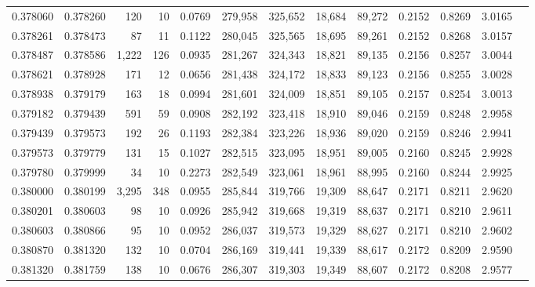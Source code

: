 \begin{tabular}{rrrrrrrrrrrrr}
0.378060 & 0.378260 &   120 &  10 &                                     0.0769 & 279,958 & 325,652 &  18,684 &  89,272 & 0.2152 & 0.8269 & 3.0165 \\
0.378261 & 0.378473 &    87 &  11 &                                     0.1122 & 280,045 & 325,565 &  18,695 &  89,261 & 0.2152 & 0.8268 & 3.0157 \\
0.378487 & 0.378586 & 1,222 & 126 &                                     0.0935 & 281,267 & 324,343 &  18,821 &  89,135 & 0.2156 & 0.8257 & 3.0044 \\
0.378621 & 0.378928 &   171 &  12 &                                     0.0656 & 281,438 & 324,172 &  18,833 &  89,123 & 0.2156 & 0.8255 & 3.0028 \\
0.378938 & 0.379179 &   163 &  18 &                                     0.0994 & 281,601 & 324,009 &  18,851 &  89,105 & 0.2157 & 0.8254 & 3.0013 \\
0.379182 & 0.379439 &   591 &  59 &                                     0.0908 & 282,192 & 323,418 &  18,910 &  89,046 & 0.2159 & 0.8248 & 2.9958 \\
0.379439 & 0.379573 &   192 &  26 &                                     0.1193 & 282,384 & 323,226 &  18,936 &  89,020 & 0.2159 & 0.8246 & 2.9941 \\
0.379573 & 0.379779 &   131 &  15 &                                     0.1027 & 282,515 & 323,095 &  18,951 &  89,005 & 0.2160 & 0.8245 & 2.9928 \\
0.379780 & 0.379999 &    34 &  10 &                                     0.2273 & 282,549 & 323,061 &  18,961 &  88,995 & 0.2160 & 0.8244 & 2.9925 \\
0.380000 & 0.380199 & 3,295 & 348 &                                     0.0955 & 285,844 & 319,766 &  19,309 &  88,647 & 0.2171 & 0.8211 & 2.9620 \\
0.380201 & 0.380603 &    98 &  10 &                                     0.0926 & 285,942 & 319,668 &  19,319 &  88,637 & 0.2171 & 0.8210 & 2.9611 \\
0.380603 & 0.380866 &    95 &  10 &                                     0.0952 & 286,037 & 319,573 &  19,329 &  88,627 & 0.2171 & 0.8210 & 2.9602 \\
0.380870 & 0.381320 &   132 &  10 &                                     0.0704 & 286,169 & 319,441 &  19,339 &  88,617 & 0.2172 & 0.8209 & 2.9590 \\
0.381320 & 0.381759 &   138 &  10 &                                     0.0676 & 286,307 & 319,303 &  19,349 &  88,607 & 0.2172 & 0.8208 & 2.9577 \\

\end{tabular}
